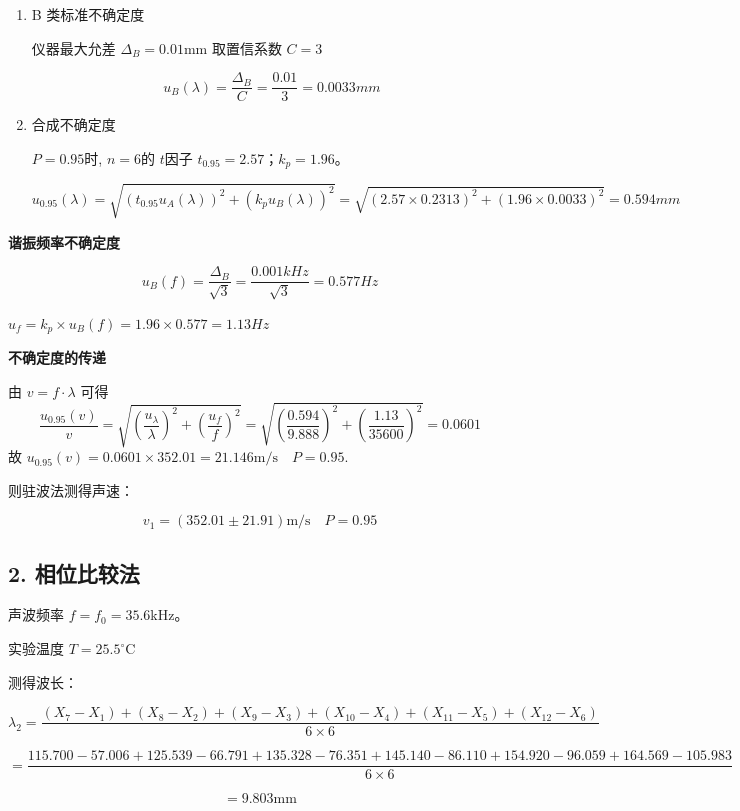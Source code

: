 \documentclass[12pt,a4paper]{article}
\begin{document}
\begin{enumerate}
\begin{enumerate}
        \item[2)] B 类标准不确定度
		
		仪器最大允差 $\Delta_{B} = 0.01$mm
		取置信系数 $C = 3$

		$$u_{B}(\lambda)=\frac{\Delta_{B}}{C}=\frac{0.01}{3}=0.0033mm$$
        
    	\item[3)]合成不确定度
		
		$P=0.95$时, $n=6$的 $t$因子 $t_{0.95} = 2.57$；$k_{p} = 1.96$。

		$$u_{0.95}(\lambda)=\sqrt{(t_{0.95}u_{A}(\lambda))^{2}+(k_{p}u_{B}(\lambda))^{2}}=\sqrt{(2.57\times 0.2313)^{2}+(1.96\times 0.0033)^{2}}=0.594mm$$
    \end{enumerate}

    \textbf{谐振频率不确定度}
	
	$$u_{B}(f)=\frac{\Delta_{B}}{\sqrt{3}}=\frac{0.001kHz}{\sqrt{3}}=0.577Hz$$

    $u_{f}=k_{p}\times u_{B}(f)=1.96\times 0.577=1.13Hz$

    \textbf{不确定度的传递}

	 由 $v=f\cdot\lambda$ 可得
    $$\frac{u_{0.95}(v)}{v}=\sqrt{\left(\frac{u_{\lambda}}{\lambda}\right)^{2}+\left(\frac{u_{f}}{f}\right)^{2}}=\sqrt{\left(\frac{0.594}{9.888}\right)^{2}+\left(\frac{1.13}{35600}\right)^{2}}=0.0601$$
    故 $u_{0.95}(v)=0.0601\times 352.01 = 21.146\mathrm{m/s}\quad P=0.95$.

    则驻波法测得声速：
	
	$$v_1 = (352.01\pm 21.91)\mathrm{m/s} \quad P = 0.95$$

\end{enumerate}

\subsection*{2. 相位比较法}


	声波频率 $f = f_{0} = 35.6$kHz。

	实验温度 $T = 25.5^{\circ}\mathrm{C}$

	测得波长：
    
	\begin{footnotesize}
	$$\lambda_{2}=\frac{(X_{7}-X_{1})+(X_{8}-X_{2})+(X_{9}-X_{3})+(X_{10}-X_{4})+(X_{11}-X_{5})+(X_{12}-X_{6})}{6\times6}$$

	$$=\frac{115.700-57.006+125.539-66.791+135.328-76.351+145.140-86.110+154.920-96.059+164.569-105.983}{6\times6}$$

		$$=9.803\mathrm{mm}$$

	\end{footnotesize}
\end{document}
